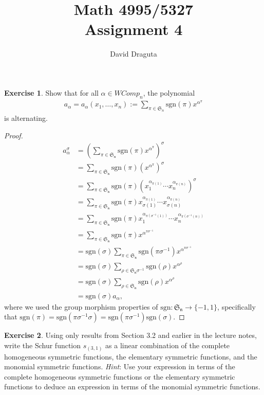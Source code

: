 \documentclass[12pt]{extarticle}
\title{ Math 4995/5327
  \\
  Assignment 4}
\author{David Draguta}
\newcommand{\set}[1]{\{#1\}}
\newcommand{\sgn}{\text{sgn}}
\newcommand{\<}{\langle}
\renewcommand{\>}{\rangle}
\theoremstyle{definition}
\newtheorem{exercise}{Exercise}
\begin{document}
\maketitle

\begin{exercise}
  Show that for all $\alpha \in WComp_n$, the polynomial
  \begin{align*}
    a_{\alpha} = a_{\alpha}(x_1, \dots, x_n) := \sum\limits_{\pi \in \mathfrak{S}_n} \sgn(\pi) x^{\alpha^{\pi}}
  \end{align*}
  is alternating.
\end{exercise}
\begin{proof}
  \begin{align*}
    a_{\alpha}^{\sigma}
    &= (\sum\limits_{\pi \in \mathfrak{S_n}} \sgn(\pi) x^{\alpha^{\pi}})^{\sigma} \\ 
    &= \sum\limits_{\pi \in \mathfrak{S_n}} \sgn(\pi) (x^{\alpha^{\pi}})^{\sigma} \\
    &= \sum\limits_{\pi \in \mathfrak{S_n}} \sgn(\pi) (x_1^{\alpha_{\pi(1)}} \cdots x_n^{\alpha_{\pi(n)}})^{\sigma} \\
    &= \sum\limits_{\pi \in \mathfrak{S_n}} \sgn(\pi) x_{\sigma(1)}^{\alpha_{\pi(1)}} \cdots x_{\sigma(n)}^{\alpha_{\pi(n)}} \\
    &= \sum\limits_{\pi \in \mathfrak{S_n}} \sgn(\pi) x_{1}^{\alpha_{\pi(\sigma^{-1}(1))}} \cdots x_{n}^{\alpha_{\pi(\sigma^{-1}(n))}} \\
    &= \sum\limits_{\pi \in \mathfrak{S_n}} \sgn(\pi) x^{\alpha^{\pi\sigma^{-1}}} \\
    &= \sgn(\sigma)\sum\limits_{\pi \in \mathfrak{S_n}} \sgn(\pi\sigma^{-1}) x^{\alpha^{\pi\sigma^{-1}}} \\
    &= \sgn(\sigma)\sum\limits_{\rho \in \mathfrak{S_n}\sigma^{-1}} \sgn(\rho) x^{\alpha^{\rho}} \\
    &= \sgn(\sigma)\sum\limits_{\rho \in \mathfrak{S_n}} \sgn(\rho) x^{\alpha^{\rho}} \\
    &= \sgn(\sigma)a_{\alpha},
  \end{align*}
  where we used the group morphism properties of $\sgn: \mathfrak{S_n} \to \set{-1,1}$, specifically that
  $\sgn(\pi) = \sgn(\pi \sigma^{-1} \sigma) = \sgn(\pi \sigma^{-1}) \sgn(\sigma)$.
\end{proof}
\begin{exercise}
  Using only results from Section 3.2 and earlier in the lecture notes, write the Schur function $s_{(3,1)}$ as a linear combination of the complete homogeneous symmetric functions, the elementary symmetric functions, and the monomial symmetric functions. \emph{Hint}: Use your expression in terms of the complete homogeneous symmetric functions or the elementary symmetric functions to deduce an expression in terms of the monomial symmetric functions. 
\end{exercise}
\end{document}
